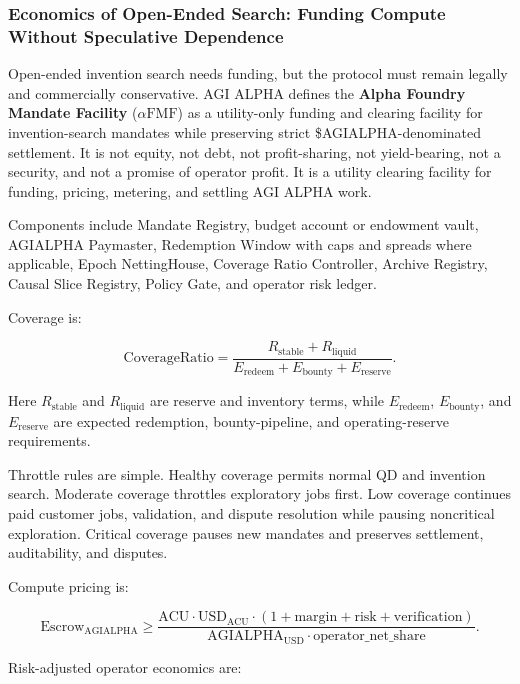 \documentclass[
  11pt,
]{article}
\begin{document}
\subsubsection{Economics of Open-Ended Search: Funding Compute Without
Speculative
Dependence}\label{economics-of-open-ended-search-funding-compute-without-speculative-dependence}

Open-ended invention search needs funding, but the protocol must remain
legally and commercially conservative. AGI ALPHA defines the
\textbf{Alpha Foundry Mandate Facility} (\(\alpha\mathrm{FMF}\)) as a
utility-only funding and clearing facility for invention-search mandates
while preserving strict \$AGIALPHA-denominated settlement. It is not
equity, not debt, not profit-sharing, not yield-bearing, not a security,
and not a promise of operator profit. It is a utility clearing facility
for funding, pricing, metering, and settling AGI ALPHA work.

Components include Mandate Registry, budget account or endowment vault,
AGIALPHA Paymaster, Redemption Window with caps and spreads where
applicable, Epoch NettingHouse, Coverage Ratio Controller, Archive
Registry, Causal Slice Registry, Policy Gate, and operator risk ledger.

Coverage is:

\[
\mathrm{CoverageRatio}
=
\frac{R_{\mathrm{stable}}+R_{\mathrm{liquid}}}
{E_{\mathrm{redeem}}+E_{\mathrm{bounty}}+E_{\mathrm{reserve}}}.
\]

Here \(R_{\mathrm{stable}}\) and \(R_{\mathrm{liquid}}\) are reserve and
inventory terms, while \(E_{\mathrm{redeem}}\), \(E_{\mathrm{bounty}}\),
and \(E_{\mathrm{reserve}}\) are expected redemption, bounty-pipeline,
and operating-reserve requirements.

Throttle rules are simple. Healthy coverage permits normal QD and
invention search. Moderate coverage throttles exploratory jobs first.
Low coverage continues paid customer jobs, validation, and dispute
resolution while pausing noncritical exploration. Critical coverage
pauses new mandates and preserves settlement, auditability, and
disputes.

Compute pricing is:

\[
\mathrm{Escrow}_{\mathrm{AGIALPHA}}
\ge
\frac{
\mathrm{ACU}\cdot \mathrm{USD}_{\mathrm{ACU}}\cdot
(1+\mathrm{margin}+\mathrm{risk}+\mathrm{verification})
}{
\mathrm{AGIALPHA}_{\mathrm{USD}}\cdot
\mathrm{operator\_net\_share}
}.
\]

Risk-adjusted operator economics are:
\end{document}
